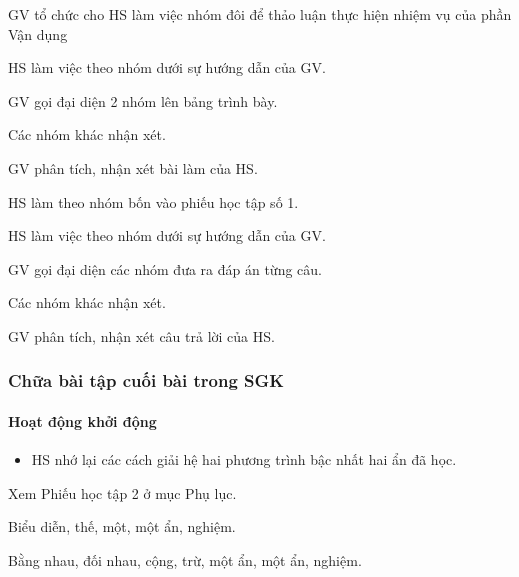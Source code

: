 \begin{tcth}[vandung=3]
    \buocmot
    \item GV tổ chức cho HS làm việc nhóm đôi để thảo luận thực hiện nhiệm vụ của phần Vận dụng
    \buochai
    \item HS làm việc theo nhóm dưới sự hướng dẫn của GV. 
    \buocba
    \item GV gọi đại diện 2 nhóm lên bảng trình bày.
    \item Các nhóm khác nhận xét.
    \buocbon
    \item GV phân tích, nhận xét bài làm của HS.
\end{tcth}

\begin{tcth}[phieuhoctap=1]
	\buocmot
	\item HS làm theo nhóm bốn vào phiếu học tập số 1.
	\buochai
	\item HS làm việc theo nhóm dưới sự hướng dẫn của GV. 
	\buocba
	\item GV gọi đại diện các nhóm đưa ra đáp án từng câu.
	\item Các nhóm khác nhận xét.
	\buocbon
	\item GV phân tích, nhận xét câu trả lời của HS.
\end{tcth}

\subsubsection{Chữa bài tập cuối bài trong SGK}

\paragraph{Hoạt động khởi động}

\muctieu

\begin{itemize}
    \item HS nhớ lại các cách giải hệ hai phương trình bậc nhất hai ẩn đã học. 
\end{itemize}

\noidungsanpham

\begin{phieuhoctap}
	Xem Phiếu học tập 2 ở mục Phụ lục.
	\doicot
	\huongdan
    \begin{bt}
        Biểu diễn, thế, một, một ẩn, nghiệm.
    \end{bt}
    \begin{bt}
        Bằng nhau, đối nhau, cộng, trừ, một ẩn, một ẩn, nghiệm.
    \end{bt}
\end{phieuhoctap}

